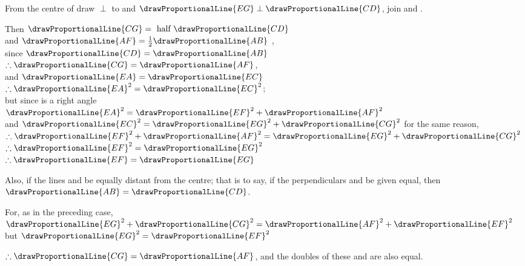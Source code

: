 \documentclass[booklanguage=english]{byrnebook}
\begin{document}
\begin{center}
From the centre of  draw  $\perp$ to  and $\drawProportionalLine{EG} \perp \drawProportionalLine{CD}$, join  and .

Then $\drawProportionalLine{CG} = \mbox{ half } \drawProportionalLine{CD}$ \\
and $\drawProportionalLine{AF} = \frac{1}{2} \drawProportionalLine{AB}$ ,\\
since $\drawProportionalLine{CD} = \drawProportionalLine{AB}$ \byref{\hypref}\\
$\therefore \drawProportionalLine{CG} = \drawProportionalLine{AF}$,\\
and $\drawProportionalLine{EA} = \drawProportionalLine{EC}$ \\
$\therefore \drawProportionalLine{EA}^2 = \drawProportionalLine{EC}^2$;\\
but since  is a right angle\\
$\drawProportionalLine{EA}^2 = \drawProportionalLine{EF}^2 + \drawProportionalLine{AF}^2$ \\
and $\drawProportionalLine{EC}^2 = \drawProportionalLine{EG}^2 + \drawProportionalLine{CG}^2$ for the same reason,\\
$\therefore \drawProportionalLine{EF}^2 + \drawProportionalLine{AF}^2 = \drawProportionalLine{EG}^2 + \drawProportionalLine{CG}^2$\\
$\therefore \drawProportionalLine{EF}^2 = \drawProportionalLine{EG}^2$\\
$\therefore \drawProportionalLine{EF} = \drawProportionalLine{EG}$
\end{center}

Also, if the lines  and  be equally distant from the centre; that is to say, if the perpendiculars  and  be given equal, then $\drawProportionalLine{AB} = \drawProportionalLine{CD}$.

\begin{center}
For, as in the preceding case,\\
$\drawProportionalLine{EG}^2 + \drawProportionalLine{CG}^2 = \drawProportionalLine{AF}^2 + \drawProportionalLine{EF}^2$\\
but $\drawProportionalLine{EG}^2 = \drawProportionalLine{EF}^2$

$\therefore \drawProportionalLine{CG} = \drawProportionalLine{AF}$, %
and the doubles of these  and  are also equal.
\end{center}
\end{document}
